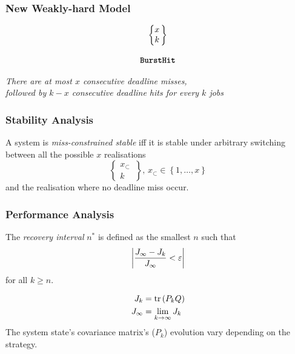 \begin{frame}
    \frametitle{New Weakly-hard Model}
    \begin{equation*}
        \begin{matrix}
            \left\{\begin{matrix}
                x \\
                k
            \end{matrix}\,\right\} \\
                                 \\
            \texttt{\textbf{BurstHit}}
        \end{matrix}
    \end{equation*}

    \vspace{1cm}

    \begin{center}
        \emph{There are at most $x$ consecutive deadline misses,} \\
        \emph{followed by $k-x$ consecutive deadline hits for every $k$ jobs} 
    \end{center}
\end{frame}

\begin{frame}
    \frametitle{Stability Analysis}
    \begin{definition}
        A system is \emph{miss-constrained stable} iff it is stable under arbitrary switching between all the possible $x$ realisations
        \[
            \left\{\begin{matrix} x_{\subset} \\ k \end{matrix}\,\right\},\, x_{\subset} \in \left\{ 1,\ldots,x \right\}
        \]
        and the realisation where no deadline miss occur.
    \end{definition}
\end{frame}

\begin{frame}
    \frametitle{Performance Analysis}
    \begin{definition}
        The \emph{recovery interval} $n^*$ is defined as the smallest $n$ such that
        \begin{equation*}
            \left|\frac{J_{\infty} - J_k}{J_{\infty}} < \varepsilon\right|
        \end{equation*}
        for all $k \geq n$.
    \end{definition}
    \begin{equation*}
        \begin{aligned}
            J_{k} &= \mathrm{tr}\left( P_k Q \right) \\
            J_{\infty} &= \lim_{k \rightarrow \infty} J_k
        \end{aligned}
    \end{equation*}
    The system state's covariance matrix's ($P_k$) evolution vary depending on the strategy.
\end{frame}

